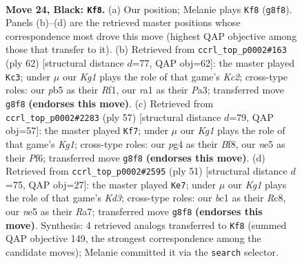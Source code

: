 \documentclass[11pt]{article}
\begin{document}
\clearpage

\begin{figure}[p]\centering
\begin{subfigure}{0.46\textwidth}\centering
\resizebox{\linewidth}{!}{%
\newchessgame
\chessboard[
  setfen={rn4k1/p1r2pbp/Pp6/1P1nN1R1/4pPP1/8/4B3/R1B1K3 b Q f3 0 24},
  showmover=false,
  pgfstyle=straightmove, color=movearrow, markmove={g8-f8}
]}
\caption{}
\end{subfigure}\hfill
\begin{subfigure}{0.46\textwidth}\centering
\resizebox{\linewidth}{!}{%
\newchessgame
\chessboard[
  setfen={2br4/4bprp/pk2pp2/5P1B/1P1N4/P2R2P1/2K4P/5R2 w - - 0 32},
  showmover=false,
  pgfstyle=straightmove, color=movearrow, markmove={c2-c3}
]}
\caption{}
\end{subfigure}
\\[4pt]
\begin{subfigure}{0.46\textwidth}\centering
\resizebox{\linewidth}{!}{%
\newchessgame
\chessboard[
  setfen={3r1bk1/1r4p1/p4p2/2nNp3/1Bp1P2R/P7/1PP3P1/2KR4 b - - 5 29},
  showmover=false,
  pgfstyle=straightmove, color=movearrow, markmove={g8-f7}
]}
\caption{}
\end{subfigure}\hfill
\begin{subfigure}{0.46\textwidth}\centering
\resizebox{\linewidth}{!}{%
\newchessgame
\chessboard[
  setfen={2r5/r4p2/1npk2pp/p3p1b1/P3P3/1B2NP1P/1P1R1P2/2R3K1 b - - 8 26},
  showmover=false,
  pgfstyle=straightmove, color=movearrow, markmove={d6-e7}
]}
\caption{}
\end{subfigure}
\caption{\textbf{Move 24, Black: \texttt{Kf8}.} (a) Our position; Melanie plays \texttt{Kf8} (\texttt{g8f8}). Panels (b)--(d) are the retrieved master positions whose correspondence most drove this move (highest QAP objective among those that transfer to it). (b) Retrieved from \texttt{ccrl\_top\_p0002\#163} (ply 62) [structural distance $d$=77, QAP obj=62]: the master played \texttt{Kc3}; under $\mu$ our \emph{Kg1} plays the role of that game's \emph{Kc2}; cross-type roles: our \emph{p}b5 as their \emph{R}f1, our \emph{r}a1 as their \emph{P}a3; transferred move \texttt{g8f8} \textbf{(endorses this move)}. (c) Retrieved from \texttt{ccrl\_top\_p0002\#2283} (ply 57) [structural distance $d$=79, QAP obj=57]: the master played \texttt{Kf7}; under $\mu$ our \emph{Kg1} plays the role of that game's \emph{Kg1}; cross-type roles: our \emph{p}g4 as their \emph{B}f8, our \emph{n}e5 as their \emph{P}f6; transferred move \texttt{g8f8} \textbf{(endorses this move)}. (d) Retrieved from \texttt{ccrl\_top\_p0002\#2595} (ply 51) [structural distance $d$=75, QAP obj=27]: the master played \texttt{Ke7}; under $\mu$ our \emph{Kg1} plays the role of that game's \emph{Kd3}; cross-type roles: our \emph{b}c1 as their \emph{R}c8, our \emph{n}e5 as their \emph{R}a7; transferred move \texttt{g8f8} \textbf{(endorses this move)}. Synthesis: 4 retrieved analogs transferred to \texttt{Kf8} (summed QAP objective 149, the strongest correspondence among the candidate moves); Melanie committed it via the \texttt{search} selector.}
\label{fig:thought-m47}
\end{figure}
\end{document}
